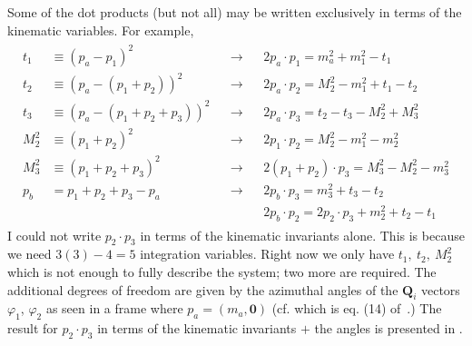 
Some of the dot products (but not all) may be written exclusively in terms of the kinematic variables. For example,
\begin{gather*}
    \begin{align*}
        t_1 &\equiv (p_a - p_1)^2 &&\rightarrow 
            && 2 p_a \cdot p_1 = m_a^2 +  m_1^2 - t_1 \\
        t_2 &\equiv (p_a - (p_1 + p_2))^2 &&\rightarrow 
            && 2 p_a \cdot p_2 = M_2^2 - m_1^2 + t_1 - t_2 \\
        t_3 &\equiv (p_a - (p_1 + p_2 + p_3))^2 &&\rightarrow 
            && 2 p_a \cdot p_3 = t_2 - t_3 - M_2^2 + M_3^2 \\
        M_2^2 &\equiv (p_1 + p_2)^2 &&\rightarrow 
            && 2 p_1 \cdot p_2 = M_2^2 - m_1^2 - m_2^2 \\
        M_3^2 &\equiv (p_1 + p_2 + p_3)^2 &&\rightarrow 
            && 2 (p_1 + p_2) \cdot p_3 = M_3^2 - M_2^2 - m_3^2 \\
        p_b &= p_1 + p_2 + p_3 - p_a &&\rightarrow
            && 2p_b \cdot p_3 = m_3^2 + t_3 - t_2 \\
        & && && 2p_b \cdot p_2 = 2 p_2 \cdot p_3 + m_2^2 + t_2 - t_1
    \end{align*}
\end{gather*}
I could not write $p_2 \cdot p_3$ in terms of the kinematic invariants alone.
This is because we need $3(3) - 4 = 5$ integration variables. Right now we only have $t_1,\ t_2,\ M_2^2$ which is not enough to fully describe the system; two more are required. 
The additional degrees of freedom are given by the azimuthal angles of the $\bm{Q}_i$ vectors $\varphi_1$, $\varphi_2$ as seen in a frame where $p_a = (m_a, \bm{0})$ (cf.  which is eq. (14) of~\cite{Byckling:1969sx}.)
The result for $p_2 \cdot p_3$ in terms of the kinematic invariants $+$ the angles is presented in .

